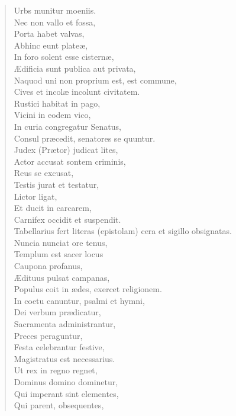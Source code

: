 \documentclass[12pt,  postvopaper]{memoir}
\begin{document}
\begin{verse}

  Urbs munitur moeniis.\\
  Nec non vallo et fossa,\\
  Porta habet valvas,\\
  Abhinc eunt plateæ,\\
  In foro solent esse cisternæ,\\
  Ædificia sunt publica aut privata,\\
  Naquod uni non proprium est, est commune,\\
  Cives et incolæ incolunt civitatem.\\
  Rustici habitat in pago,\\
  Vicini in eodem vico,\\
  In curia congregatur Senatus,\\
  Consul præcedit, senatores se quuntur.\\
  Judex (Prætor) judicat lites,\\
  Actor accusat sontem criminis,\\
  Reus se excusat,\\
  Testis jurat et testatur,\\
  Lictor ligat,\\
  Et ducit in carcarem,\\
  Carnifex occidit et suspendit.\\
  Tabellarius fert literas (epistolam) cera et sigillo obsignatas.\\
  Nuncia nunciat ore tenus,\\
  Templum est sacer locus\\
  Caupona profanus,\\
  Ædituus pulsat campanas,\\
  Populus coit in ædes, exercet religionem.\\
  In coetu canuntur, psalmi et hymni,\\
  Dei verbum prædicatur,\\
  Sacramenta administrantur,\\
  Preces peraguntur,\\
  Festa celebrantur festive,\\
  Magistratus est necessarius.\\
  Ut rex in regno regnet,\\
  Dominus domino dominetur,\\
  Qui imperant sint elementes,\\
  Qui parent, obsequentes,\\

\end{verse}
\end{document}
